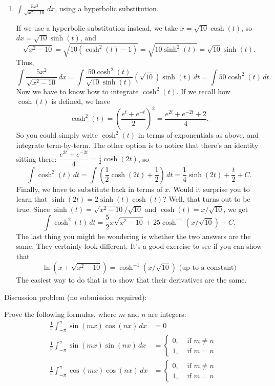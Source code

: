 \documentclass[12pt]{article}
\newcommand{\di}{\displaystyle}
\begin{document}
\begin{enumerate}
 \bigskip
 

 
\item  $\di \int \frac{5x^2}{\sqrt{x^2-10}}\,dx$, using a hyperbolic substitution.

 If we use a hyperbolic substitution instead, we take $x=\sqrt{10}\cosh(t)$, so $dx = \sqrt{10}\sinh(t)$, and
 \[
 \sqrt{x^2-10} = \sqrt{10(\cosh^2(t)-1)} = \sqrt{10\sinh^2(t)} = \sqrt{10}\sinh(t).
 \]
 Thus,
 \[
 \int \frac{5x^2}{\sqrt{x^2-10}}\,dx = \int \frac{50\cosh^2(t)}{\sqrt{10}\sinh(t)}(\sqrt{10})\sinh(t)\,dt = \int 50\cosh^2(t)\,dt.
 \]
 Now we have to know how to integrate $\cosh^2(t)$. If we recall how $\cosh(t)$ is defined, we have
 \[
 \cosh^2(t) = \left(\frac{e^t+e^{-t}}{2}\right)^2 = \frac{e^{2t}+e^{-2t}+2}{4}.
 \]
 So you could simply write $\cosh^2(t)$ in terms of exponentials as above, and integrate term-by-term. The other option is to notice that there's an identity sitting there: $\dfrac{e^{2t}+e^{-2t}}{4} = \frac{1}{2}\cosh(2t)$, so
 \[
 \int \cosh^2(t)\,dt = \int\left( \frac{1}{2}\cosh(2t)+\frac{1}{2}\right)\,dt = \frac{1}{4}\sinh(2t)+\frac{t}{2}+C.
 \]
 Finally, we have to substitute back in terms of $x$. Would it surprise you to learn that $\sinh(2t)=2\sinh(t)\cosh(t)$? Well, that turns out to be true. Since $\sinh(t) = \sqrt{x^2-10}/\sqrt{10}$ and $\cosh(t) = x/\sqrt{10}$, we get
 \[
 \int\cosh^2(t)\,dt = \frac{5}{2}x\sqrt{x^2-10}+25\cosh^{-1}(x/\sqrt{10})+C.
 \]
 The last thing you might be wondering is whether the two answers are the same. They certainly look different. It's a good exercise to see if you can show that
 \[
 \ln(x+\sqrt{x^2-10}) = \cosh^{-1}(x/\sqrt{10}) \text{ (up to a constant)}
 \]
 The easiest way to do that is to show that their derivatives are the same.

  \end{enumerate}

Discussion problem (no submission required):

Prove the following formulas, where $m$ and $n$ are integers:
\begin{align*}
\frac{1}{\pi}\int_{-\pi}^\pi\sin(mx)\cos(nx)\,dx & = 0\\
\frac{1}{\pi}\int_{-\pi}^\pi\sin(mx)\sin(nx)\,dx & = \begin{cases}0, & \text{ if } m\neq n\\1, & \text{ if } m=n\end{cases}\\
\frac{1}{\pi}\int_{-\pi}^\pi\cos(mx)\cos(nx)\,dx & = \begin{cases}0, & \text{ if } m\neq n\\1, & \text{ if } m=n\end{cases}
\end{align*}
\end{document}

